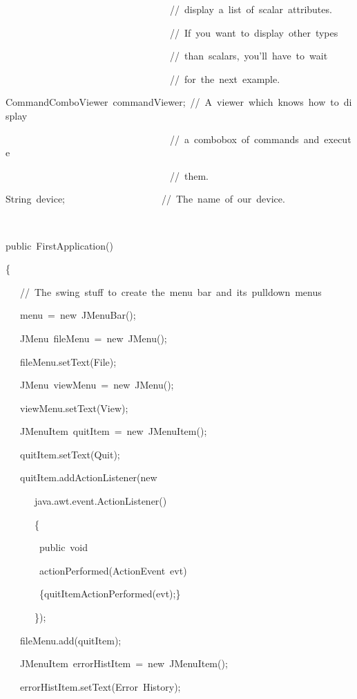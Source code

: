\begin{lyxcode}
~~~~~~~~~~~~~~~~~~~~~~~~~~~~~~~~~~//~display~a~list~of~scalar~attributes.

~~~~~~~~~~~~~~~~~~~~~~~~~~~~~~~~~~//~If~you~want~to~display~other~types

~~~~~~~~~~~~~~~~~~~~~~~~~~~~~~~~~~//~than~scalars,~you'll~have~to~wait

~~~~~~~~~~~~~~~~~~~~~~~~~~~~~~~~~~//~for~the~next~example.

CommandComboViewer~commandViewer;~//~A~viewer~which~knows~how~to~display

~~~~~~~~~~~~~~~~~~~~~~~~~~~~~~~~~~//~a~combobox~of~commands~and~execute

~~~~~~~~~~~~~~~~~~~~~~~~~~~~~~~~~~//~them.

String~device;~~~~~~~~~~~~~~~~~~~~//~The~name~of~our~device.

~



public~FirstApplication()

\{

~~~//~The~swing~stuff~to~create~the~menu~bar~and~its~pulldown~menus

~~~menu~=~new~JMenuBar();

~~~JMenu~fileMenu~=~new~JMenu();

~~~fileMenu.setText(\textquotedbl{}File\textquotedbl{});~~~

~~~JMenu~viewMenu~=~new~JMenu();

~~~viewMenu.setText(\textquotedbl{}View\textquotedbl{});



~~~JMenuItem~quitItem~=~new~JMenuItem();

~~~quitItem.setText(\textquotedbl{}Quit\textquotedbl{});

~~~quitItem.addActionListener(new~

~~~~~~java.awt.event.ActionListener()

~~~~~~\{~~~~~~~~~~~~~~~~~

~~~~~~~public~void

~~~~~~~actionPerformed(ActionEvent~evt)

~~~~~~~\{quitItemActionPerformed(evt);\}

~~~~~~\});

~~~fileMenu.add(quitItem);



~~~JMenuItem~errorHistItem~=~new~JMenuItem();

~~~errorHistItem.setText(\textquotedbl{}Error~History\textquotedbl{});


\end{lyxcode}
